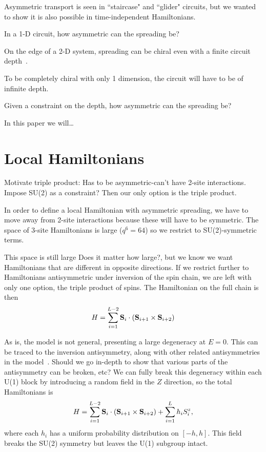 \documentclass[aps,prl,reprint,superscriptaddress, longbibliography]{revtex4-1}
\newcommand{\charlie}[1]{ {\color{Magenta} {{#1}}}}
\begin{document}
Asymmetric transport is seen in ``staircase" and ``glider" circuits, but we wanted to show it is also possible in time-independent Hamiltonians. 

In a 1-D circuit, how asymmetric can the spreading be?

On the edge of a 2-D system, spreading can be chiral even with a finite circuit depth~\cite{PoChiralCircuit}.

To be completely chiral with only 1 dimension, the circuit will have to be of infinite depth.

Given a constraint on the depth, how asymmetric can the spreading be?

In this paper we will\dots

\pagebreak

\section{Local Hamiltonians}

Motivate triple product:
Has to be asymmetric-can't have 2-site interactions.
Impose SU(2) as a constraint?
Then our only option is the triple product.

In order to define a local Hamiltonian with asymmetric spreading, we have to move away from 2-site interactions because these will have to be symmetric. The space of 3-site Hamiltonians is large ($q^{6} = 64$) so we restrict to SU(2)-symmetric terms.

This space is still large \charlie{Does it matter how large?}, but we know we want Hamiltonians that are different in opposite directions. If we restrict further to Hamiltonians antisymmetric under inversion of the spin chain, we are left with only one option, the triple product of spins. The Hamiltonian on the full chain is then
\begin{align}
H = \sum_{i=1}^{L-2}{\bf S}_i\cdot({\bf S}_{i+1}\times {\bf S}_{i+2})\nonumber
\end{align}

As is, the model is not general, presenting a large degeneracy at $E=0$. This can be traced to the inversion antisymmetry, along with other related antisymmetries in the model~\cite{1710.05927}. \charlie{Should we go in-depth to show that various parts of the antisymmetry can be broken, etc?} We can fully break this degeneracy within each U(1) block by introducing a random field in the $Z$ direction, so the total Hamiltonians is
\begin{align}
H = \sum_{i=1}^{L-2}{\bf S}_i\cdot({\bf S}_{i+1}\times {\bf S}_{i+2}) + 
	\sum_{i=1}^{L}h_iS_i^z,
\end{align}
where each $h_i$ has a uniform probability distribution on $[-h,h]$. This field breaks the SU(2) symmetry but leaves the U(1) subgroup intact.
\end{document}
